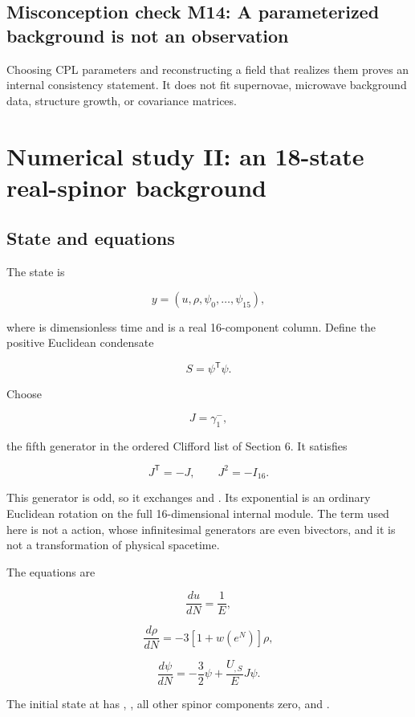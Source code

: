 \documentclass[11pt]{article}
\begin{document}
\subsection{Misconception check M14: A parameterized background is not an observation}

Choosing CPL parameters and reconstructing a field that realizes them proves an internal consistency statement. It does not fit supernovae, microwave background data, structure growth, or covariance matrices.

\section{Numerical study II: an 18-state real-spinor background}

\subsection{State and equations}

The state is

\[
y=(u,\rho,\psi_0,\ldots,\psi_{15}),
\]

where \texttt{} is dimensionless time and \texttt{} is a real 16-component column. Define the positive Euclidean condensate

\[
S=\psi^{\mathsf T}\psi.
\]

Choose

\[
J=\gamma_1^-,
\]

the fifth generator in the ordered Clifford list of Section 6. It satisfies

\[
J^{\mathsf T}=-J,\qquad J^2=-I_{16}.
\]

This generator is odd, so it exchanges \texttt{} and \texttt{}. Its exponential is an ordinary Euclidean rotation on the full 16-dimensional internal module. The term used here is not a \texttt{} action, whose infinitesimal generators are even bivectors, and it is not a transformation of physical spacetime.

The equations are

\[
\frac{du}{dN}=\frac1E,
\]

\[
\frac{d\rho}{dN}=-3[1+w(e^N)]\rho,
\]

\[
\frac{d\psi}{dN}=-\frac32\psi+\frac{U_{,S}}EJ\psi.
\]

The initial state at \texttt{} has \texttt{}, \texttt{}, all other spinor components zero, and \texttt{}.
\end{document}

